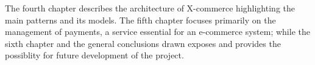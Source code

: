 \newline
The fourth chapter describes the architecture of X-commerce highlighting the main patterns and its models.
The fifth chapter focuses primarily on the management of payments, a service essential for an e-commerce system; while the sixth chapter and the general conclusions drawn exposes and provides the possiblity for future development of the project.